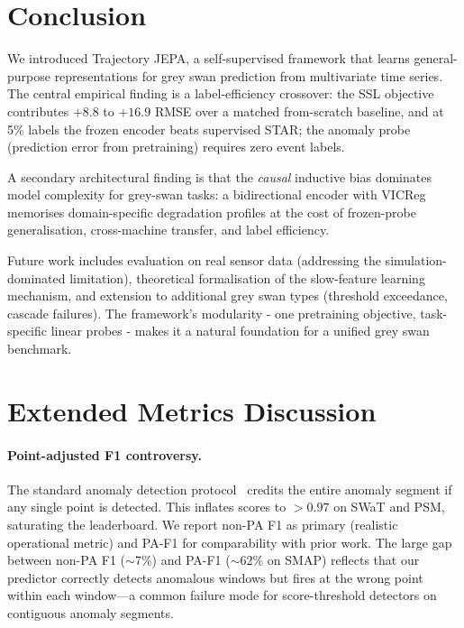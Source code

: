 \documentclass{article}
\begin{document}
\section{Conclusion}
\label{sec:conclusion}

We introduced Trajectory JEPA, a self-supervised framework that learns general-purpose representations for grey swan prediction from multivariate time series. The central empirical finding is a label-efficiency crossover: the SSL objective contributes $+8.8$ to $+16.9$ RMSE over a matched from-scratch baseline, and at 5\% labels the frozen encoder beats supervised STAR; the anomaly probe (prediction error from pretraining) requires zero event labels.

A secondary architectural finding is that the \emph{causal} inductive bias dominates model complexity for grey-swan tasks: a bidirectional encoder with VICReg memorises domain-specific degradation profiles at the cost of frozen-probe generalisation, cross-machine transfer, and label efficiency.

Future work includes evaluation on real sensor data (addressing the simulation-dominated limitation), theoretical formalisation of the slow-feature learning mechanism, and extension to additional grey swan types (threshold exceedance, cascade failures). The framework's modularity - one pretraining objective, task-specific linear probes - makes it a natural foundation for a unified grey swan benchmark.




\newpage
\appendix

\section{Extended Metrics Discussion}
\label{app:metrics}

\paragraph{Point-adjusted F1 controversy.}
The standard anomaly detection protocol~\citep{schmidl2022tsadeval} credits the entire anomaly segment if any single point is detected. This inflates scores to $>0.97$ on SWaT and PSM, saturating the leaderboard. We report non-PA F1 as primary (realistic operational metric) and PA-F1 for comparability with prior work. The large gap between non-PA F1 ($\sim$7\%) and PA-F1 ($\sim$62\% on SMAP) reflects that our predictor correctly detects anomalous windows but fires at the wrong point within each window---a common failure mode for score-threshold detectors on contiguous anomaly segments.
\end{document}
